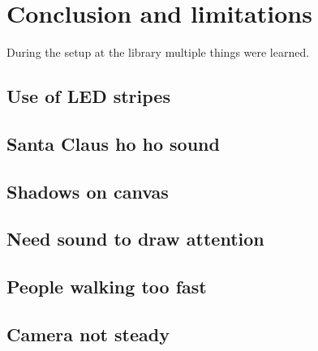 \section{Conclusion and limitations}
During the setup at the library multiple things were learned.

\subsection{Use of LED stripes}
\subsection{Santa Claus ho ho sound}
\subsection{Shadows on canvas}
\subsection{Need sound to draw attention}
\subsection{People walking too fast}
\subsection{Camera not steady}


